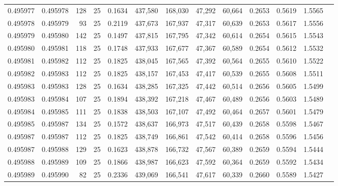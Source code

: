 \begin{tabular}{rrrrrrrrrrrrr}
0.495977 & 0.495978 &   128 &  25 &                                     0.1634 & 437,580 & 168,030 &  47,292 &  60,664 & 0.2653 & 0.5619 & 1.5565 \\
0.495978 & 0.495979 &    93 &  25 &                                     0.2119 & 437,673 & 167,937 &  47,317 &  60,639 & 0.2653 & 0.5617 & 1.5556 \\
0.495979 & 0.495980 &   142 &  25 &                                     0.1497 & 437,815 & 167,795 &  47,342 &  60,614 & 0.2654 & 0.5615 & 1.5543 \\
0.495980 & 0.495981 &   118 &  25 &                                     0.1748 & 437,933 & 167,677 &  47,367 &  60,589 & 0.2654 & 0.5612 & 1.5532 \\
0.495981 & 0.495982 &   112 &  25 &                                     0.1825 & 438,045 & 167,565 &  47,392 &  60,564 & 0.2655 & 0.5610 & 1.5522 \\
0.495982 & 0.495983 &   112 &  25 &                                     0.1825 & 438,157 & 167,453 &  47,417 &  60,539 & 0.2655 & 0.5608 & 1.5511 \\
0.495983 & 0.495983 &   128 &  25 &                                     0.1634 & 438,285 & 167,325 &  47,442 &  60,514 & 0.2656 & 0.5605 & 1.5499 \\
0.495983 & 0.495984 &   107 &  25 &                                     0.1894 & 438,392 & 167,218 &  47,467 &  60,489 & 0.2656 & 0.5603 & 1.5489 \\
0.495984 & 0.495985 &   111 &  25 &                                     0.1838 & 438,503 & 167,107 &  47,492 &  60,464 & 0.2657 & 0.5601 & 1.5479 \\
0.495985 & 0.495987 &   134 &  25 &                                     0.1572 & 438,637 & 166,973 &  47,517 &  60,439 & 0.2658 & 0.5598 & 1.5467 \\
0.495987 & 0.495987 &   112 &  25 &                                     0.1825 & 438,749 & 166,861 &  47,542 &  60,414 & 0.2658 & 0.5596 & 1.5456 \\
0.495987 & 0.495988 &   129 &  25 &                                     0.1623 & 438,878 & 166,732 &  47,567 &  60,389 & 0.2659 & 0.5594 & 1.5444 \\
0.495988 & 0.495989 &   109 &  25 &                                     0.1866 & 438,987 & 166,623 &  47,592 &  60,364 & 0.2659 & 0.5592 & 1.5434 \\
0.495989 & 0.495990 &    82 &  25 &                                     0.2336 & 439,069 & 166,541 &  47,617 &  60,339 & 0.2660 & 0.5589 & 1.5427 \\

\end{tabular}

